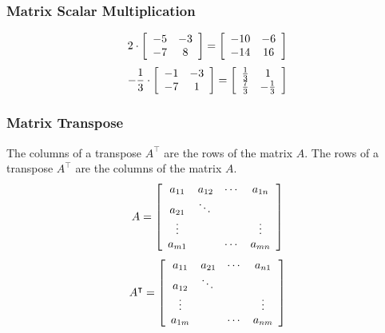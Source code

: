 \documentclass[xcolor=dvipsnames]{beamer}
\begin{document}
\begin{frame}
  \frametitle{Matrix Scalar Multiplication}
  \begin{equation}
    \label{eq:quooroaw}
    2\cdot\left[
      \begin{array}{cc}
        -5 & -3 \\
        -7 & 8 
      \end{array}\right]=\left[
      \begin{array}{cc}
        -10 & -6 \\
        -14 & 16
      \end{array}\right]\notag
  \end{equation}
  \begin{equation}
    \label{eq:xaexoopi}
    -\frac{1}{3}\cdot\left[
      \begin{array}{cc}
        -1 & -3 \\
        -7 & 1 
      \end{array}\right]=\left[
      \begin{array}{cc}
        \frac{1}{3} & 1 \\
        \frac{7}{3} & -\frac{1}{3}
      \end{array}\right]\notag
  \end{equation}
\end{frame}

\begin{frame}
  \frametitle{Matrix Transpose}
  The columns of a \alert{transpose} $A^{\intercal}$ are the rows of the
  matrix $A$. The rows of a transpose $A^{\intercal}$ are the columns
  of the matrix $A$.
  \begin{equation}
    \label{eq:chuiruth}
        A=\left[\begin{array}{cccc}
    a_{11}&a_{12}&\cdots{}&a_{1n} \\
          a_{21}&\ddots{}&& \\
          \vdots{}&&&\vdots \\
          a_{m1}&&\cdots{}&a_{mn}
  \end{array}\right]\notag
  \end{equation}
  \begin{equation}
    \label{eq:aetheini}
        A^{\intercal}=\left[\begin{array}{cccc}
    a_{11}&a_{21}&\cdots{}&a_{n1} \\
          a_{12}&\ddots{}&& \\
          \vdots{}&&&\vdots \\
          a_{1m}&&\cdots{}&a_{nm}
  \end{array}\right]\notag
  \end{equation}
\end{frame}
\end{document}
